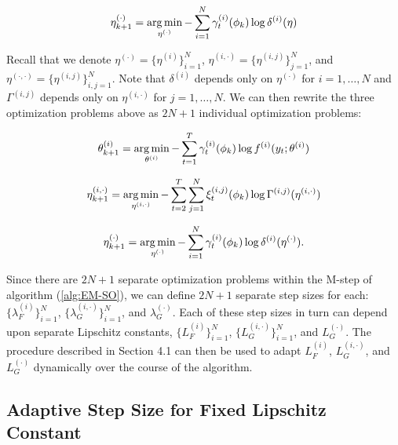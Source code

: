 \begin{equation}
    \eta^{(\cdot)}_{k+1} = \operatorname*{arg\,min}_{\eta^{(\cdot)}} - \sum_{i=1}^N \gamma^{(i)}_t(\phi_{k}) \log \delta^{(i)}(\eta)
\end{equation}

Recall that we denote $\eta^{(\cdot)} = \{\eta^{(i)}\}_{i=1}^N$, 
$\eta^{(i,\cdot)} = \big\{\eta^{(i,j)}\big\}_{j=1}^N$, and $\eta^{(\cdot,\cdot)} = \big\{\eta^{(i,j)}\big\}_{i,j=1}^N$. Note that $\delta^{(i)}$ depends only on $\eta^{(\cdot)}$ for $i = 1,\ldots,N$ and $\Gamma^{(i,j)}$ depends only on $\eta^{(i,\cdot)}$ for $j = 1,\ldots,N$. We can then rewrite the three optimization problems above as $2N + 1$ individual optimization problems:

\begin{equation} 
    \theta^{(i)}_{k+1} = \operatorname*{arg\,min}_{\theta^{(i)}} - \sum_{t=1}^T \gamma^{(i)}_t(\phi_{k}) \log f^{(i)}(y_t;\theta^{(i)})
\end{equation}

\begin{equation}
    \eta^{(i,\cdot)}_{k+1} = \operatorname*{arg\,min}_{\eta^{(i,\cdot)}} - \sum_{t=2}^T \sum_{j=1}^N \xi^{(i,j)}_t(\phi_{k}) \log \Gamma^{(i,j)}(\eta^{(i,\cdot)})
\end{equation}

\begin{equation}
    \eta^{(\cdot)}_{k+1} = \operatorname*{arg\,min}_{\eta^{(\cdot)}} - \sum_{i=1}^N \gamma^{(i)}_t(\phi_{k}) \log \delta^{(i)}(\eta^{(\cdot)}).
\end{equation}

Since there are $2N+1$ separate optimization problems within the M-step of algorithm (\ref{alg:EM-SO}), we can define $2N+1$ separate step sizes for each: $\big\{\lambda_F^{(i)}\big\}_{i=1}^N$, $\big\{\lambda_G^{(i,\cdot)}\big\}_{i=1}^N$, and $\lambda_G^{(\cdot)}$. Each of these step sizes in turn can depend upon separate Lipschitz constants, $\big\{L_F^{(i)}\big\}_{i=1}^N$, $\big\{L_G^{(i,\cdot)}\big\}_{i=1}^N$, and $L_G^{(\cdot)}$. The procedure described in Section 4.1 can then be used to adapt $L_F^{(i)}$, $L_G^{(i,\cdot)}$, and $L_G^{(\cdot)}$ dynamically over the course of the algorithm.

\subsection{Adaptive Step Size for Fixed Lipschitz Constant}
\label{subsec:L_divider}

